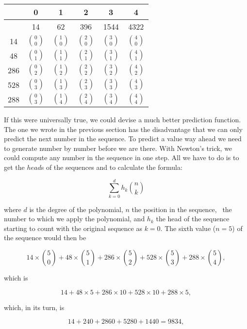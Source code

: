\documentclass[tikz]{scrreprt}
\newcommand{\Varid}[1]{\mathit{#1}}
\begin{document}
\begin{center}
\begingroup
\renewcommand{\arraystretch}{1.5}
\begin{tabular}{||c||c|c|c|c|c||}
\hline
     &  0 &  1  &  2  &  3   &  4   \\\hline
     & 14         & 62         & 396        & 1544       & 4322       \\\hline\hline
  14 &$\binom{0}{0}$&$\binom{1}{0}$&$\binom{2}{0}$&$\binom{3}{0}$&$\binom{4}{0}$\\\hline
  48 &$\binom{0}{1}$&$\binom{1}{1}$&$\binom{2}{1}$&$\binom{3}{1}$&$\binom{4}{1}$\\\hline
 286 &$\binom{0}{2}$&$\binom{1}{2}$&$\binom{2}{2}$&$\binom{3}{2}$&$\binom{4}{2}$\\\hline
 528 &$\binom{0}{3}$&$\binom{1}{3}$&$\binom{2}{3}$&$\binom{3}{3}$&$\binom{4}{3}$\\\hline
 288 &$\binom{0}{3}$&$\binom{1}{4}$&$\binom{2}{4}$&$\binom{3}{4}$&$\binom{4}{4}$\\\hline
\end{tabular}
\endgroup
\end{center}

If this were universally true, we could devise a 
much better prediction function. The one we wrote
in the previous section has the disadvantage
that we can only predict the next number in the sequence.
To predict a value way ahead we need to generate
number by number before we are there.
With Newton's trick, we could compute any number
in the sequence in one step.
All we have to do is to get the \ensuremath{\Varid{head}}s of the sequences
and to calculate the formula:

\[
\sum_{k=0}^{d}{h_k\binom{n}{k}} 
\]

where $d$ is the degree of the polynomial, $n$
the position in the sequence, \ie\ the number
to which we apply the polynomial, and $h_k$
the head of the sequence starting to count
with the original sequence as $k=0$.
The sixth value ($n=5$) of the sequence would then be

\[
  14 \times \binom{5}{0} + 
  48 \times \binom{5}{1} + 
 286 \times \binom{5}{2} + 
 528 \times \binom{5}{3} + 
 288 \times \binom{5}{4}, 
\]

which is

\[
  14           + 
  48 \times  5 + 
 286 \times 10 + 
 528 \times 10 + 
 288 \times  5, 
\]

which, in its turn, is

\[
14 + 240 + 2860 + 5280 + 1440 = 9834,
\]
\end{document}
